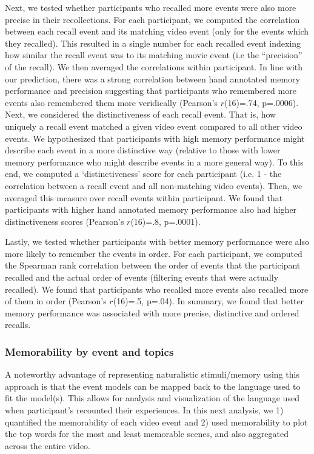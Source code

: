 \documentclass{article}
\begin{document}
{Next, we tested whether participants who recalled more events were also more precise in their recollections. For each participant, we computed the correlation between each recall event and its matching video event (only for the events which they recalled). This resulted in a single number for each recalled event indexing how similar the recall event was to its matching movie event (i.e the ``precision'' of the recall). We then averaged the correlations within participant. In line with our prediction, there was a strong correlation between hand annotated memory performance and precision suggesting that participants who remembered more events also remembered them more veridically (Pearson's $r$(16)=.74, p=.0006). Next, we considered the distinctiveness of each recall event. That is, how uniquely a recall event matched a given video event compared to all other video events. We hypothesized that participants with high memory performance might describe each event in a more distinctive way (relative to those with lower memory performance who might describe events in a more general way). To this end, we computed a `distinctiveness' score for each participant (i.e. 1 - the correlation between a recall event and all non-matching video events).  Then, we averaged this measure over recall events within participant.  We found that participants with higher hand annotated memory performance also had higher distinctiveness scores (Pearson's $r$(16)=.8, p=.0001).

Lastly, we tested whether participants with better memory performance were also more likely to remember the events in order.  For each participant, we computed the Spearman rank correlation between the order of events that the participant recalled and the actual order of events (filtering events that were actually recalled).  We found that participants who recalled more events also recalled more of them in order (Pearson's $r$(16)=.5, p=.04). In summary, we found that better memory performance was associated with more precise, distinctive and ordered recalls.

\subsubsection{Memorability by event and topics}
A noteworthy advantage of representing naturalistic stimuli/memory using this approach is that the event models can be mapped back to the language used to fit the model(s).  This allows for analysis and visualization of the language used when participant's recounted their experiences.  In this next analysis, we 1) quantified the memorability of each video event and 2) used memorability to plot the top words for the most and least memorable scenes, and also aggregated across the entire video.

}
\end{document}
